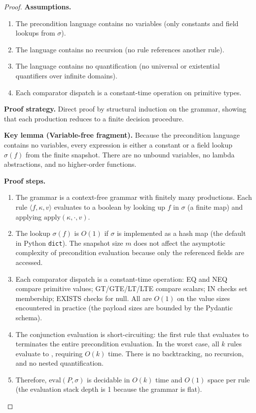 \begin{proof}
\textbf{Assumptions.}
\begin{enumerate}[label=(A\arabic*),leftmargin=2em]
    \item The precondition language contains no variables (only constants and field lookups from $\sigma$).
    \item The language contains no recursion (no rule references another rule).
    \item The language contains no quantification (no universal or existential quantifiers over infinite domains).
    \item Each comparator dispatch is a constant-time operation on primitive types.
\end{enumerate}

\textbf{Proof strategy.} Direct proof by structural induction on the grammar, showing that each production reduces to a finite decision procedure.

\textbf{Key lemma (Variable-free fragment).} Because the precondition language contains no variables, every expression is either a constant or a field lookup $\sigma(f)$ from the finite snapshot. There are no unbound variables, no lambda abstractions, and no higher-order functions.

\textbf{Proof steps.}
\begin{enumerate}[label=Step~\arabic*:,leftmargin=2em]
    \item The grammar is a context-free grammar with finitely many productions. Each rule $\langle f, \kappa, v \rangle$ evaluates to a boolean by looking up $f$ in $\sigma$ (a finite map) and applying $\text{apply}(\kappa, \cdot, v)$.
    \item The lookup $\sigma(f)$ is $O(1)$ if $\sigma$ is implemented as a hash map (the default in Python \texttt{dict}). The snapshot size $m$ does not affect the asymptotic complexity of precondition evaluation because only the referenced fields are accessed.
    \item Each comparator dispatch is a constant-time operation: EQ and NEQ compare primitive values; GT/GTE/LT/LTE compare scalars; IN checks set membership; EXISTS checks for null. All are $O(1)$ on the value sizes encountered in practice (the payload sizes are bounded by the Pydantic schema).
    \item The conjunction evaluation is short-circuiting: the first rule that evaluates to  terminates the entire precondition evaluation. In the worst case, all $k$ rules evaluate to , requiring $O(k)$ time. There is no backtracking, no recursion, and no nested quantification.
    \item Therefore, $\text{eval}(P, \sigma)$ is decidable in $O(k)$ time and $O(1)$ space per rule (the evaluation stack depth is 1 because the grammar is flat).
\end{enumerate}


\end{proof}
